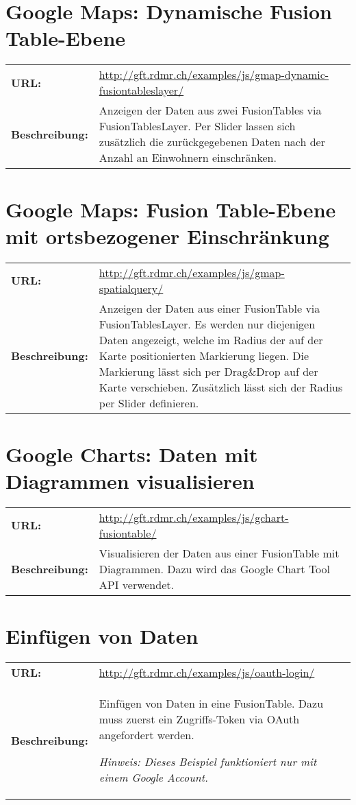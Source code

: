 \section{Google Maps: Dynamische Fusion Table-Ebene}
\begin{tabular}{p{0.2\twocelltabwidth}p{0.8\twocelltabwidth}}
\textbf{URL:} & \url{http://gft.rdmr.ch/examples/js/gmap-dynamic-fusiontableslayer/} \\ 
\textbf{Beschreibung:} & Anzeigen der Daten aus zwei FusionTables via FusionTablesLayer. Per Slider lassen sich zusätzlich die zurückgegebenen Daten nach der Anzahl an Einwohnern einschränken.  \\ 
\end{tabular} 

\section{Google Maps: Fusion Table-Ebene mit ortsbezogener Einschränkung}
\begin{tabular}{p{0.2\twocelltabwidth}p{0.8\twocelltabwidth}}
\textbf{URL:} & \url{http://gft.rdmr.ch/examples/js/gmap-spatialquery/} \\ 
\textbf{Beschreibung:} & Anzeigen der Daten aus einer FusionTable via FusionTablesLayer. Es werden nur diejenigen Daten angezeigt, welche im Radius der auf der Karte positionierten Markierung liegen. Die Markierung lässt sich per Drag{\&}Drop auf der Karte verschieben. Zusätzlich lässt sich der Radius per Slider definieren. \\ 
\end{tabular} 

\section{Google Charts: Daten mit Diagrammen visualisieren}
\begin{tabular}{p{0.2\twocelltabwidth}p{0.8\twocelltabwidth}}
\textbf{URL:} & \url{http://gft.rdmr.ch/examples/js/gchart-fusiontable/} \\ 
\textbf{Beschreibung:} & Visualisieren der Daten aus einer FusionTable mit Diagrammen. Dazu wird das Google Chart Tool API verwendet. \\ 
\end{tabular} 

\section{Einfügen von Daten}
\begin{tabular}{p{0.2\twocelltabwidth}p{0.8\twocelltabwidth}}
\textbf{URL:} & \url{http://gft.rdmr.ch/examples/js/oauth-login/} \\ 
\textbf{Beschreibung:} & Einfügen von Daten in eine FusionTable. Dazu muss zuerst ein Zugriffs-Token via OAuth angefordert werden.

\textit{Hinweis: Dieses Beispiel funktioniert nur mit einem Google Account.} \\ 
\end{tabular} 

